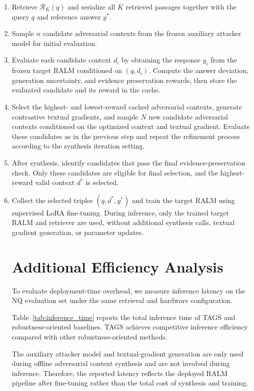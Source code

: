 \documentclass[11pt]{article}
\begin{document}
\begin{enumerate}

\item Retrieve $\mathcal{R}_{K}(q)$ and serialize all $K$ retrieved passages together with the query $q$ and reference answer $y^*$.

\item Sample $n$ candidate adversarial contexts from the frozen auxiliary attacker model for initial evaluation.

\item Evaluate each candidate context $d_i$ by obtaining the response $y_i$ from the frozen target RALM conditioned on $(q,d_i)$.
Compute the answer deviation, generation uncertainty, and evidence preservation rewards, then store the evaluated candidate and its reward in the cache.

\item Select the highest- and lowest-reward cached adversarial contexts, generate contrastive textual gradients, and sample $N$ new candidate adversarial contexts conditioned on the optimized context and textual gradient.
Evaluate these candidates as in the previous step and repeat the refinement process according to the synthesis iteration setting.

\item After synthesis, identify candidates that pass the final evidence-preservation check.
Only these candidates are eligible for final selection, and the highest-reward valid context $d^*$ is selected.

\item Collect the selected triples $(q,d^*,y^*)$ and train the target RALM using supervised LoRA fine-tuning.
During inference, only the trained target RALM and retriever are used, without additional synthesis calls, textual gradient generation, or parameter updates.
\section{Additional Efficiency Analysis}

To evaluate deployment-time overhead, we measure inference latency on the NQ evaluation set under the same retrieval and hardware configuration.

Table~\ref{tab:inference_time} reports the total inference time of TAGS and robustness-oriented baselines. TAGS achieves competitive inference efficiency compared with other robustness-oriented methods.

The auxiliary attacker model and textual-gradient generation are only used during offline adversarial context synthesis and are not involved during inference. Therefore, the reported latency reflects the deployed RALM pipeline after fine-tuning rather than the total cost of synthesis and training.



\end{enumerate}
\end{document}
